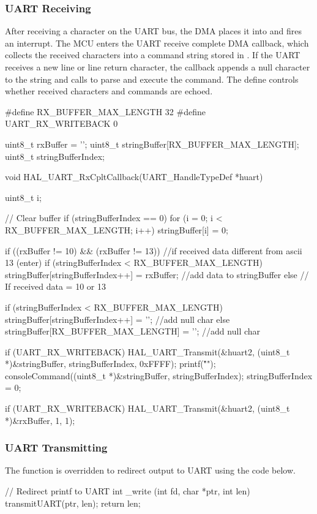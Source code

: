 \subsubsection{UART Receiving}
After receiving a character on the UART bus, the DMA places it into  and fires an interrupt. The MCU enters the UART receive complete DMA callback,  which collects the received characters into a command string stored in . If the UART receives a new line or line return character, the callback appends a null character to the string and calls  to parse and execute the command. The define  controls whether received characters and commands are echoed.
\begin{clisting}
#define RX_BUFFER_MAX_LENGTH 32 
#define UART_RX_WRITEBACK 0

uint8_t rxBuffer = '';
uint8_t stringBuffer[RX_BUFFER_MAX_LENGTH];
uint8_t stringBufferIndex;

void HAL_UART_RxCpltCallback(UART_HandleTypeDef *huart)
{
    uint8_t i;

    // Clear buffer
    if (stringBufferIndex == 0) {for (i = 0; i < RX_BUFFER_MAX_LENGTH; i++) stringBuffer[i] = 0;}	

    if ((rxBuffer != 10) && (rxBuffer != 13))	//if received data different from ascii 13 (enter)
    {
        if (stringBufferIndex < RX_BUFFER_MAX_LENGTH){
            stringBuffer[stringBufferIndex++] = rxBuffer; //add data to stringBuffer
        }
    }
    else // If received data = 10 or 13
    {
        if (stringBufferIndex < RX_BUFFER_MAX_LENGTH){
            stringBuffer[stringBufferIndex++] = '\0'; //add null char
        } else {
            stringBuffer[RX_BUFFER_MAX_LENGTH] = '\0'; //add null char
        }

        if (UART_RX_WRITEBACK){
            HAL_UART_Transmit(&huart2, (uint8_t *)&stringBuffer, stringBufferIndex, 0xFFFF);
            printf("\r\n");
        }
        consoleCommand((uint8_t *)&stringBuffer, stringBufferIndex);
        stringBufferIndex = 0;
    }

    if (UART_RX_WRITEBACK){
        HAL_UART_Transmit(&huart2, (uint8_t *)&rxBuffer, 1, 1);
    }
}
\end{clisting}

\subsubsection{UART Transmitting}
The  function is overridden to redirect  output to UART using the code below.
\begin{clisting}
// Redirect printf to UART
int _write (int fd, char *ptr, int len) 
{ 
	transmitUART(ptr, len);
	return len; 
}
\end{clisting}

